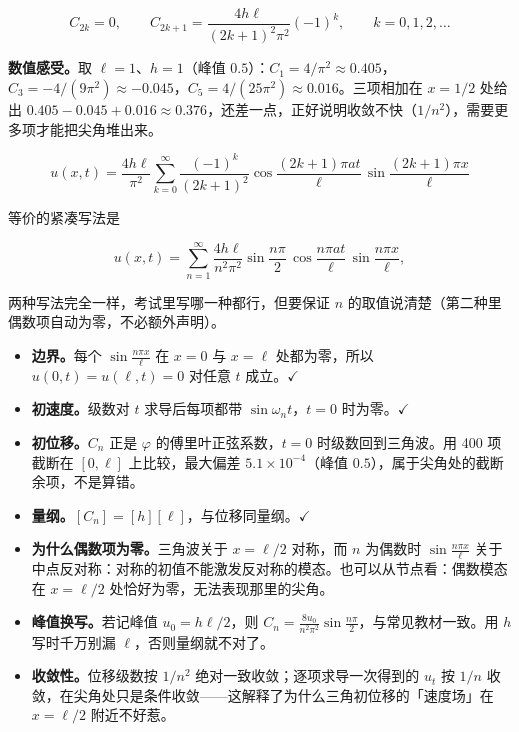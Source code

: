 \documentclass[11pt]{ctexart}
\begin{document}
\[
C_{2k}=0,
\qquad
C_{2k+1}=\frac{4h\ell}{(2k+1)^2\pi^2}(-1)^k,
\qquad k=0,1,2,\dots
\]

\textbf{数值感受。}取 $\ell=1$、$h=1$（峰值 $0.5$）：$C_1=4/\pi^2\approx0.405$，$C_3=-4/(9\pi^2)\approx-0.045$，$C_5=4/(25\pi^2)\approx0.016$。三项相加在 $x=1/2$ 处给出 $0.405-0.045+0.016\approx0.376$，还差一点，正好说明收敛不快（$1/n^2$），需要更多项才能把尖角堆出来。


\[
\boxed{\;
u(x,t)=\frac{4h\ell}{\pi^2}\sum_{k=0}^{\infty}\frac{(-1)^k}{(2k+1)^2}
\cos\frac{(2k+1)\pi at}{\ell}\,
\sin\frac{(2k+1)\pi x}{\ell}
\;}
\]

等价的紧凑写法是

\[
u(x,t)=\sum_{n=1}^{\infty}\frac{4h\ell}{n^2\pi^2}\sin\frac{n\pi}{2}\,
\cos\frac{n\pi at}{\ell}\,\sin\frac{n\pi x}{\ell},
\]

两种写法完全一样，考试里写哪一种都行，但要保证 $n$ 的取值说清楚（第二种里偶数项自动为零，不必额外声明）。


\begin{itemize}
  \item \textbf{边界。}每个 $\sin\frac{n\pi x}{\ell}$ 在 $x=0$ 与 $x=\ell$ 处都为零，所以 $u(0,t)=u(\ell,t)=0$ 对任意 $t$ 成立。$\checkmark$
  \item \textbf{初速度。}级数对 $t$ 求导后每项都带 $\sin\omega_nt$，$t=0$ 时为零。$\checkmark$
  \item \textbf{初位移。}$C_n$ 正是 $\varphi$ 的傅里叶正弦系数，$t=0$ 时级数回到三角波。用 400 项截断在 $[0,\ell]$ 上比较，最大偏差 $5.1\times10^{-4}$（峰值 $0.5$），属于尖角处的截断余项，不是算错。
  \item \textbf{量纲。}$[C_n]=[h][\ell]$，与位移同量纲。$\checkmark$
  \item \textbf{为什么偶数项为零。}三角波关于 $x=\ell/2$ 对称，而 $n$ 为偶数时 $\sin\frac{n\pi x}{\ell}$ 关于中点反对称：对称的初值不能激发反对称的模态。也可以从节点看：偶数模态在 $x=\ell/2$ 处恰好为零，无法表现那里的尖角。
  \item \textbf{峰值换写。}若记峰值 $u_0=h\ell/2$，则 $C_n=\frac{8u_0}{n^2\pi^2}\sin\frac{n\pi}{2}$，与常见教材一致。用 $h$ 写时千万别漏 $\ell$，否则量纲就不对了。
  \item \textbf{收敛性。}位移级数按 $1/n^2$ 绝对一致收敛；逐项求导一次得到的 $u_t$ 按 $1/n$ 收敛，在尖角处只是条件收敛——这解释了为什么三角初位移的「速度场」在 $x=\ell/2$ 附近不好惹。
\end{itemize}
\end{document}
